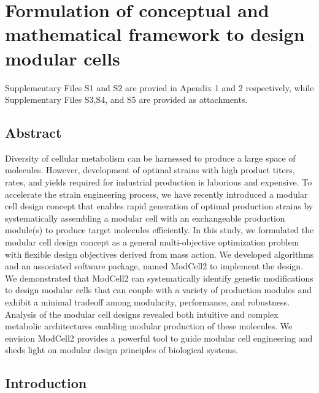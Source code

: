 \chapter{Formulation of conceptual and mathematical framework to design modular cells}\label{ch:field}

Supplementary Files S1 and S2 are provied in Apendix 1 and 2 respectively, while Supplementary Files S3,S4, and S5 are provided as attachments.


\section*{Abstract}\label{abstract}

Diversity of cellular metabolism can be harnessed to produce a large space of molecules.
However, development of optimal strains with high product titers, rates, and yields required for industrial production is laborious and expensive.
To accelerate the strain engineering process, we have recently introduced a modular cell design concept that enables rapid generation of optimal production strains by systematically assembling a modular cell with an exchangeable production module(s) to produce target molecules efficiently.
In this study, we formulated the modular cell design concept as a general multi-objective optimization problem with flexible design objectives derived from mass action.
We developed algorithms and an associated software package, named ModCell2 to implement the design.
We demonstrated that ModCell2 can systematically identify genetic modifications to design modular cells that can couple with a variety of production modules and exhibit a minimal tradeoff among modularity, performance, and robustness.
Analysis of the modular cell designs revealed both intuitive and complex metabolic architectures enabling modular production of these molecules.
We envision ModCell2 provides a powerful tool to guide modular cell engineering and sheds light on modular design principles of biological systems.

%
%

\section{Introduction}

